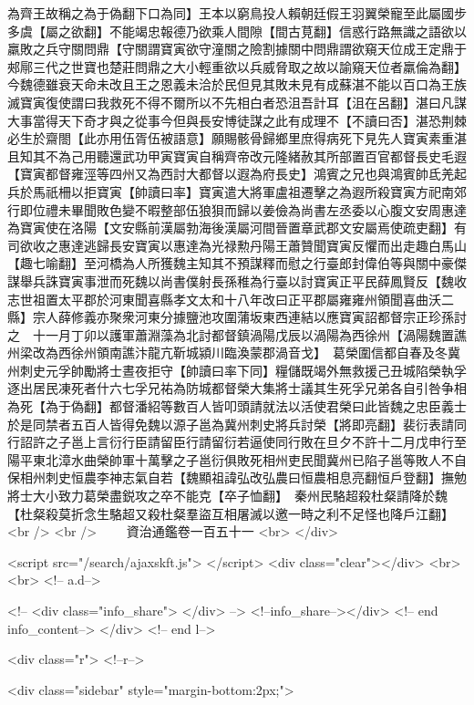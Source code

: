 為齊王故稱之為于偽翻下口為同】王本以窮鳥投人賴朝廷假王羽翼榮寵至此屬國步多虞【屬之欲翻】不能竭忠報德乃欲乘人間隙【間古莧翻】信惑行路無識之語欲以羸敗之兵守關問鼎【守關謂寶寅欲守潼關之險割據關中問鼎謂欲窺天位成王定鼎于郟鄏三代之世寶也楚莊問鼎之大小輕重欲以兵威脅取之故以諭窺天位者羸倫為翻】今魏德雖衰天命未改且王之恩義未洽於民但見其敗未見有成蘇湛不能以百口為王族滅寶寅復使謂曰我救死不得不爾所以不先相白者恐沮吾計耳【沮在呂翻】湛曰凡謀大事當得天下奇才與之從事今但與長安博徒謀之此有成理不【不讀曰否】湛恐荆棘必生於齋閤【此亦用伍胥伍被語意】願賜骸骨歸鄉里庶得病死下見先人寶寅素重湛且知其不為己用聽還武功甲寅寶寅自稱齊帝改元隆緒赦其所部置百官都督長史毛遐【寶寅都督雍涇等四州又為西討大都督以遐為府長史】鴻賓之兄也與鴻賓帥氐羌起兵於馬祇柵以拒寶寅【帥讀曰率】寶寅遣大將軍盧祖遷擊之為遐所殺寶寅方祀南郊行即位禮未畢聞敗色變不暇整部伍狼狽而歸以姜儉為尚書左丞委以心腹文安周惠達為寶寅使在洛陽【文安縣前漢屬勃海後漢屬河間晉置章武郡文安屬焉使疏吏翻】有司欲收之惠達逃歸長安寶寅以惠達為光禄勲丹陽王蕭贊聞寶寅反懼而出走趣白馬山【趣七喻翻】至河橋為人所獲魏主知其不預謀釋而慰之行臺郎封偉伯等與關中豪傑謀舉兵誅寶寅事泄而死魏以尚書僕射長孫稚為行臺以討寶寅正平民薛鳳賢反【魏收志世祖置太平郡於河東聞喜縣孝文太和十八年改曰正平郡屬雍雍州領聞喜曲沃二縣】宗人薛修義亦聚衆河東分據鹽池攻圍蒲坂東西連結以應寶寅詔都督宗正珍孫討之　十一月丁卯以護軍蕭淵藻為北討都督鎮渦陽戊辰以渦陽為西徐州【渦陽魏置譙州梁改為西徐州領南譙汴龍亢靳城潁川臨渙蒙郡渦音戈】　葛榮圍信都自春及冬冀州刺史元孚帥勵將士晝夜拒守【帥讀曰率下同】糧儲既竭外無救援己丑城陷榮執孚逐出居民凍死者什六七孚兄祐為防城都督榮大集將士議其生死孚兄弟各自引咎争相為死【為于偽翻】都督潘紹等數百人皆叩頭請就法以活使君榮曰此皆魏之忠臣義士於是同禁者五百人皆得免魏以源子邕為冀州刺史將兵討榮【將即亮翻】裴衍表請同行詔許之子邕上言衍行臣請留臣行請留衍若逼使同行敗在旦夕不許十二月戊申行至陽平東北漳水曲榮帥軍十萬擊之子邕衍俱敗死相州吏民聞冀州已陷子邕等敗人不自保相州刺史恒農李神志氣自若【魏顯祖諱弘改弘農曰恒農相息亮翻恒戶登翻】撫勉將士大小致力葛榮盡鋭攻之卒不能克【卒子恤翻】　秦州民駱超殺杜粲請降於魏【杜粲殺莫折念生駱超又殺杜粲羣盜互相屠滅以邀一時之利不足怪也降戶江翻】<br />
<br />
　　資治通鑑卷一百五十一  <br>
   </div> 

<script src="/search/ajaxskft.js"> </script>
 <div class="clear"></div>
<br>
<br>
 <!-- a.d-->

 <!--
<div class="info_share">
</div> 
-->
 <!--info_share--></div>   <!-- end info_content-->
  </div> <!-- end l-->

<div class="r">   <!--r-->



<div class="sidebar"  style="margin-bottom:2px;">

